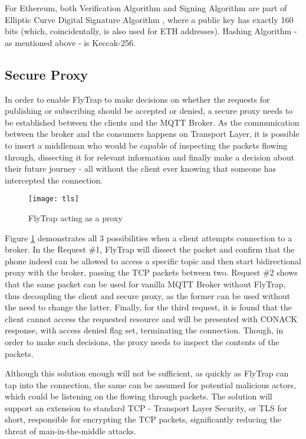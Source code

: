For Ethereum, both Verification Algorithm and Signing Algorithm are part of Elliptic Curve Digital Signature Algorithm \citep{johnson2001elliptic}, where a public key has exactly 160 bits (which, coincidentally, is also used for ETH addresses). Hashing Algorithm - as mentioned above - is Keccak-256.

\subsection{Secure Proxy}
In order to enable FlyTrap to make decisions on whether the requests for publishing or subscribing should be accepted or denied, a secure proxy needs to be established between the clients and the MQTT Broker. As the communication between the broker and the consumers happens on Transport Layer, it is possible to insert a middleman who would be capable of inspecting the packets flowing through, dissecting it for relevant information and finally make a decision about their future journey - all without the client ever knowing that someone has intercepted the connection. 
\begin{figure}[h]
    \centering
    \texttt{[image: tls]}
    \caption{FlyTrap acting as a proxy}
    \label{fig:tls}
\end{figure}
Figure \ref{fig:tls} demonstrates all 3 possibilities when a client attempts connection to a broker. In the Request \#1, FlyTrap will dissect the packet and confirm that the phone indeed can be allowed to access a specific topic and then start bidirectional proxy with the broker, passing the TCP packets between two. Request \#2 shows that the same packet can be used for vanilla MQTT Broker without FlyTrap, thus decoupling the client and secure proxy, as the former can be used without the need to change the latter. Finally, for the third request, it is found that the client cannot access the requested resource and will be presented with CONACK response, with access denied flag set, terminating the connection. Though, in order to make such decisions, the proxy needs to inspect the contents of the packets.

Although this solution enough will not be sufficient, as quickly as FlyTrap can tap into the connection, the same can be assumed for potential malicious actors, which could be listening on the flowing through packets. The solution will support an extension to standard TCP - Transport Layer Security, or TLS for short, responsible for encrypting the TCP packets, significantly reducing the threat of man-in-the-middle attacks.

